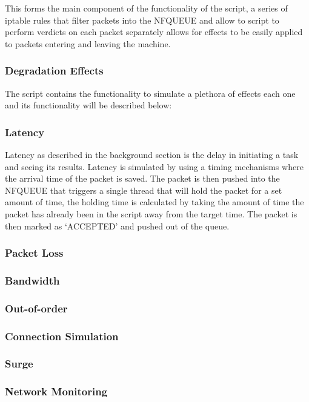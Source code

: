 This forms the main component of the functionality of the script, a series of iptable rules that filter packets into the NFQUEUE and allow to script to perform verdicts on each packet separately allows for effects to be easily applied to packets entering and leaving the machine.

\subsubsection{Degradation Effects}
The script contains the functionality to simulate a plethora of effects each one and its functionality will be described below:

\subsubsection*{Latency}
Latency as described in the background section is the delay in initiating a task and seeing its results. Latency is simulated by using a timing mechanisms where the arrival time of the packet is saved. The packet is then pushed into the NFQUEUE that triggers a single thread that will hold the packet for a set amount of time, the holding time is calculated by taking the amount of time the packet has already been in the script away from the target time. The packet is then marked as `ACCEPTED' and pushed out of the queue.

\subsubsection*{Packet Loss}


\subsubsection*{Bandwidth}

\subsubsection*{Out-of-order}

\subsubsection*{Connection Simulation}

\subsubsection*{Surge}


\subsubsection{Network Monitoring}

